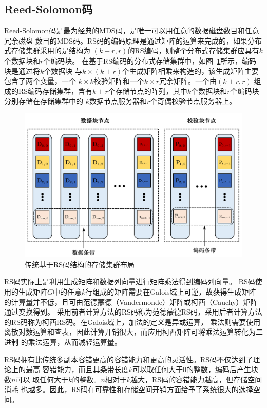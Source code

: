 \subsection{Reed-Solomon码}
Reed-Solomon码\cite{reed1960polynomial}是最为经典的MDS码，是唯一可以用任意的数据磁盘数目和任意冗余磁盘
数目的MDS码。RS码的编码原理是通过矩阵的运算来完成的，如果分布式存储集群采用的是结构为
$(k+r,r)$的RS编码，则整个分布式存储集群应具有$k$个数据块和$r$个编码块。
在基于RS编码的分布式存储集群中，如图~\ref{fig:con-1.3}所示，编码块是通过将$k$个数据块
与$k\times (k+r)$个生成矩阵相乘来构造的，该生成矩阵主要包含了两个变量，一个
$k \times k$校验矩阵和一个$k \times r$冗余矩阵\cite{li2016procode}。一个由$(k+r,r)$
组成的RS编码存储集群，含有$k+r$个存储节点的阵列，其中$k$个数据块和$r$个编码块分别存储在存储集群中的
$k$数据节点服务器和$r$个奇偶校验节点服务器上。

\begin{figure}[tb]
	\centering
	\includegraphics [scale=0.5]{figures/1.3.pdf}
	\caption{传统基于RS码结构的存储集群布局}
	\label{fig:con-1.3}
\end{figure}

RS码实际上是利用生成矩阵和数据列向量进行矩阵乘法得到编码列向量。
RS码使用的生成矩阵$G$中的任意$k$行组成的矩阵需要在Galois域上可逆，故获得生成矩阵的计算量并不低，且可由范德蒙德（Vandermonde）矩阵或柯西（Cauchy）矩阵\cite{roth1989mds}通过变换得到。
采用前者计算方法的RS码称为范德蒙德RS码，采用后者计算方法的RS码称为柯西RS码。在Galois域上，加法的定义是异或运算，
乘法则需要使用离散对数运算和查表，因此计算开销很大，而应用柯西矩阵可将乘法运算转化为二进制
的乘法运算，从而减轻运算量。

RS码拥有比传统多副本容错更高的容错能力和更高的灵活性。RS码不仅达到了理论上的最高
容错能力，而且其条带长度$k$可以取任何大于0的整数，编码后产生块数$n$可以
取任何大于$k$的整数。$n$相对于$k$越大，RS码的容错能力越高，但存储空间消耗
也越多。因此，RS码在可靠性和存储空间开销方面给予了系统很大的选择空间。

